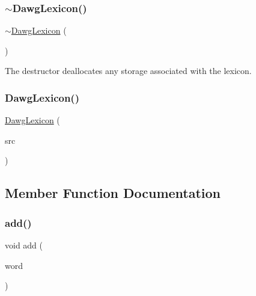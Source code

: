 \mbox{\label{classDawgLexicon_ad36da24eead1f7989047bf2d45b1a082}} 
\subsubsection{\texorpdfstring{$\sim$\+Dawg\+Lexicon()}{~DawgLexicon()}}
{\footnotesize\ttfamily $\sim$\mbox{\hyperlink{classDawgLexicon}{Dawg\+Lexicon}} (\begin{DoxyParamCaption}{ }\end{DoxyParamCaption})\hspace{0.3cm}{\ttfamily [virtual]}}



The destructor deallocates any storage associated with the lexicon. 

\mbox{\label{classDawgLexicon_a74910e5f5679d365aad6a6c47f00c655}} 
\subsubsection{\texorpdfstring{Dawg\+Lexicon()}{DawgLexicon()}\hspace{0.1cm}{\footnotesize\ttfamily [5/5]}}
{\footnotesize\ttfamily \mbox{\hyperlink{classDawgLexicon}{Dawg\+Lexicon}} (\begin{DoxyParamCaption}\item[{const \mbox{\hyperlink{classDawgLexicon}{Dawg\+Lexicon}} \&}]{src }\end{DoxyParamCaption})}



\subsection{Member Function Documentation}
\mbox{\label{classDawgLexicon_a8713d0dbe1a2aa37acf4a75ea3c5bf40}} 
\subsubsection{\texorpdfstring{add()}{add()}}
{\footnotesize\ttfamily void add (\begin{DoxyParamCaption}\item[{const std\+::string \&}]{word }\end{DoxyParamCaption})}



